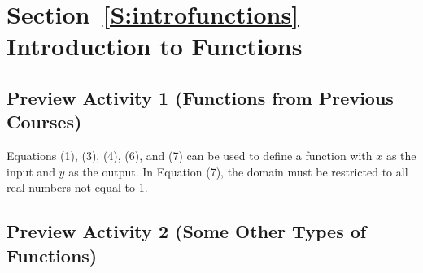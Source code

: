 \section*{Section~\ref{S:introfunctions} Introduction to Functions}

\subsection*{Preview Activity 1 (Functions from Previous Courses)}

Equations (1), (3), (4), (6), and (7) can be used to define a function with  $x$  as the input and  $y$  as the output.  In Equation (7), the domain must be restricted to all real numbers not equal to 1.
\hbreak

\noindent
\subsection*{Preview Activity 2 (Some Other Types of Functions)}
